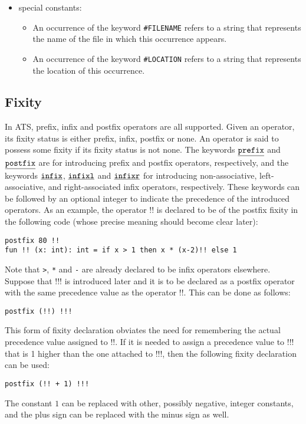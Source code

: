 \begin{itemize}
\item
special constants:
\begin{itemize}
\item 
An occurrence of the keyword \texttt{\#FILENAME} refers
to a string that represents the name of the file in which this occurrence
appears.
\item
An occurrence of the keyword \texttt{\#LOCATION} refers to a string that
represents the location of this occurrence.
\end{itemize}

\end{itemize}

\subsection{Fixity}
In ATS, prefix, infix and postfix operators are all supported. Given an
operator, its {fixity status} is either prefix, infix, postfix or none.  An
operator is said to possess some fixity if its fixity status is not none.
The keywords $\underline{\texttt{prefix}}$ and $\underline{\texttt{postfix}}$ are for introducing prefix and
postfix operators, respectively, and the keywords $\underline{\texttt{infix}}$, $\underline{\texttt{infixl}}$
and $\underline{\texttt{infixr}}$ for introducing non-associative, left-associative, and
right-associated infix operators, respectively. These keywords can be
followed by an optional integer to indicate the precedence of the
introduced operators.  As an example, the operator $!!$ is declared to be
of the postfix fixity in the following code (whose precise meaning should
become clear later):
\begin{verbatim}
postfix 80 !!
fun !! (x: int): int = if x > 1 then x * (x-2)!! else 1
\end{verbatim}
Note that \texttt{>}, \texttt{*} and \texttt{-} are already declared to be
infix operators elsewhere. Suppose that $!!!$ is introduced later and it is
to be declared as a postfix operator with the same precedence value as the
operator $!!$. This can be done as follows:
\begin{verbatim}
postfix (!!) !!!
\end{verbatim}
This form of fixity declaration obviates the need for remembering the
actual precedence value assigned to $!!$. If it is needed to assign
a precedence value to $!!!$ that is 1 higher than the one attached to
$!!!$, then the following fixity declaration can be used:
\begin{verbatim}
postfix (!! + 1) !!!
\end{verbatim}
The constant $1$ can be replaced with other, possibly negative, integer
constants, and the plus sign can be replaced with the minus sign as well.

